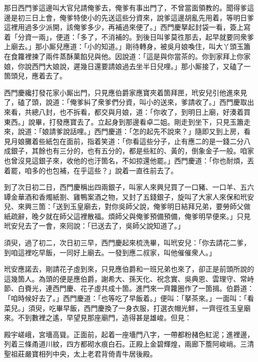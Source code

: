 那日西門爹這邊叫大官兒請俺爹去，俺爹有事出門了，不曾當面領教的。聞得爹這邊是初三日上會，俺爹特使小的先送這些分資來，說爹這邊胡亂先用着，等明日爹這裡用過多少派開，該俺爹多少，再補過來便了。」西門慶拏起封袋一看，簽上寫着「分資一兩」，便道：「多了，不消補的。到後日叫爹莫徃那去，起早就要同衆爹上廟去。」那小厮兒應道：「小的知道。」剛待轉身，被吳月娘喚住，{}叫大丫頭玉簫在食籮裡揀了兩件蒸酥菓餡兒與他。因說道：「這是與你當茶的。你到家拜上你家娘，{}你說西門大娘說，遲幾日還要請娘過去坐半日兒哩。」那小厮接了，又磕了一箇頭兒，應着去了。

西門慶纔打發花家小厮出門，只見應伯爵家應寶夾着箇拜匣，玳安兒引他進來見了，磕了頭，說道：「俺爹糾了衆爹們分資，叫小的送來，爹請收了。」西門慶取出來看，共總八封，也不拆看，都交與月娘，道：「你收了，到明日上廟，好湊着買東西。」說畢，打發應寶去了。立起身到那邊看卓二姐。剛走到坐下，只見玉簫走來，說道：「娘請爹說話哩。」{}西門慶道：「怎的起先不說來？」隨即又到上房，看見月娘攤着些紙包在面前，指着笑道：「你看這些分子，止有應二的是一錢二分八成銀子，其餘也有三分的，也有五分的，都是些紅的、黃的，倒象金子一般。咱家也曾沒見這銀子來，收他的也汙箇名，不如掠還他罷。」西門慶道：「你也耐煩，丟着罷，咱多的也包補，在乎這些？」說着一直徃前去了。

到了次日初二日，西門慶稱出四兩銀子，叫家人來興兒買了一口豬、一口羊、五六罈金華酒和香燭紙劄、雞鴨案酒之物，又封了五錢銀子，旋叫了大家人來保和玳安兒、來興三箇：「送到玉皇廟去，對你吳師父說，俺爹明日結拜兄弟，要勞師父做紙疏辭，晚夕就在師父這裡散福。煩師父與俺爹預備預備，俺爹明早便來。」只見玳安兒去了一會，來囘說：「已送去了，吳師父說知道了。」

須臾，過了初二，次日初三早，西門慶起來梳洗畢，叫玳安兒：「你去請花二爹，到咱這裡吃早飯，一同好上廟去。一發到應二叔家，叫他催催衆人。」

玳安應諾去，剛請花子虛到來，只見應伯爵和一班兄弟也來了，卻正是前頭所說的這幾箇人。為頭的便是應伯爵，謝希大、孫天化、祝念實、吳典恩、雲理守、常峙節、白賚光，連西門慶、花子虛共成十箇。進門來一齊籮圈作了一箇揖。伯爵道：「咱時候好去了。」西門慶道：「也等吃了早飯着。」便叫：「拏茶來。」一面叫：「看菜兒。」須臾，吃畢早飯，西門慶換了一身衣服，打選衣帽光鮮，一齊徑徃玉皇廟來。不到數裡之遙，早望見那座廟門，造得甚是雄峻。但見：

\begin{myquote}
殿宇嵯峨，宮墻高聳。正面前，起着一座墻門八字，一帶都粉赭色紅泥；進裡邊，列着三條甬道川紋，四方都砌水痕白石。正殿上金碧輝煌，兩廊下簷阿峻峭。三清聖祖莊嚴寶相列中央，太上老君背倚青牛居後殿。
\end{myquote}

